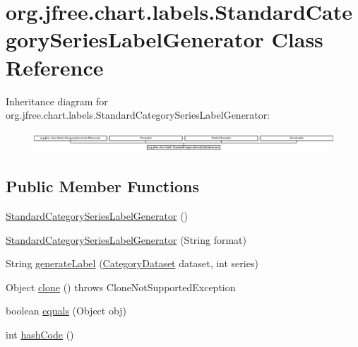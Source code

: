 \hypertarget{classorg_1_1jfree_1_1chart_1_1labels_1_1_standard_category_series_label_generator}{}\section{org.\+jfree.\+chart.\+labels.\+Standard\+Category\+Series\+Label\+Generator Class Reference}
\label{classorg_1_1jfree_1_1chart_1_1labels_1_1_standard_category_series_label_generator}
Inheritance diagram for org.\+jfree.\+chart.\+labels.\+Standard\+Category\+Series\+Label\+Generator\+:\begin{figure}[H]
\begin{center}
\leavevmode
\includegraphics[height=0.756757cm]{classorg_1_1jfree_1_1chart_1_1labels_1_1_standard_category_series_label_generator}
\end{center}
\end{figure}
\subsection*{Public Member Functions}
\begin{DoxyCompactItemize}
\item 
\mbox{\hyperlink{classorg_1_1jfree_1_1chart_1_1labels_1_1_standard_category_series_label_generator_a245519fbd17ba41d42bad8f73639d0ca}{Standard\+Category\+Series\+Label\+Generator}} ()
\item 
\mbox{\hyperlink{classorg_1_1jfree_1_1chart_1_1labels_1_1_standard_category_series_label_generator_a943fb08d5a84a0bca018d4c429f49d27}{Standard\+Category\+Series\+Label\+Generator}} (String format)
\item 
String \mbox{\hyperlink{classorg_1_1jfree_1_1chart_1_1labels_1_1_standard_category_series_label_generator_a9aeba3bfd749fa93a0477811d56b339a}{generate\+Label}} (\mbox{\hyperlink{interfaceorg_1_1jfree_1_1data_1_1category_1_1_category_dataset}{Category\+Dataset}} dataset, int series)
\item 
Object \mbox{\hyperlink{classorg_1_1jfree_1_1chart_1_1labels_1_1_standard_category_series_label_generator_afe1a23c59848da3c7cbcd4b74688faab}{clone}} ()  throws Clone\+Not\+Supported\+Exception 
\item 
boolean \mbox{\hyperlink{classorg_1_1jfree_1_1chart_1_1labels_1_1_standard_category_series_label_generator_a534490b5ac89f669f93e425d6232fe97}{equals}} (Object obj)
\item 
int \mbox{\hyperlink{classorg_1_1jfree_1_1chart_1_1labels_1_1_standard_category_series_label_generator_a903ce786feca95ae26f605624f9db3c2}{hash\+Code}} ()
\end{DoxyCompactItemize}
